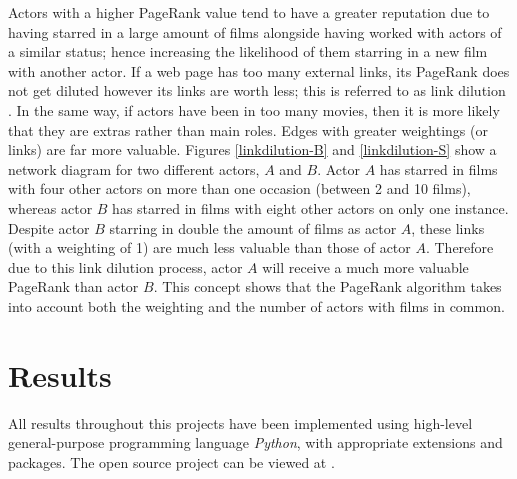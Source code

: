 \documentclass[12pt]{ieeeconf}      %
\begin{document}
\indent Actors with a higher PageRank value tend to have a greater reputation due to having starred in a large amount of films alongside having worked with actors of a similar status; hence increasing the likelihood of them starring in a new film with another actor.  If a web page has too many external links, its PageRank does not get diluted however its links are worth less; this is referred to as link dilution \cite{linkdilution}.  In the same way, if actors have been in too many movies, then it is more likely that they are extras rather than main roles.  Edges with greater weightings (or links) are far more valuable.  Figures \ref{linkdilution-B} and \ref{linkdilution-S} show a network diagram for two different actors, $A$ and $B$.  Actor $A$ has starred in films with four other actors on more than one occasion (between 2 and 10 films), whereas actor $B$ has starred in films with eight other actors on only one instance.  Despite actor $B$ starring in double the amount of films as actor $A$, these links (with a weighting of 1) are much less valuable than those of actor $A$.  Therefore due to this link dilution process, actor $A$ will receive a much more valuable PageRank than actor $B$.  This concept shows that the PageRank algorithm takes into account both the weighting and the number of actors with films in common.


\section{Results} \label{results}
\indent All results throughout this projects have been implemented using high-level general-purpose programming language \textit{Python}, with appropriate extensions and packages. The open source project can be viewed at \cite{movie-credits}.
\end{document}
